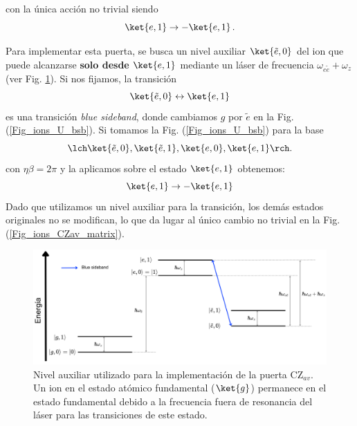 con la única acción no trivial siendo 
	\begin{equation}
	\ket{e,1} \rightarrow - \ket{e,1} \, .
	\end{equation}

Para implementar esta puerta, se busca un nivel auxiliar $\ket{\tilde{e},0}$ del ion que puede alcanzarse \textbf{solo desde} $\ket{e,1}$ mediante un láser de frecuencia $\omega_{e\tilde{e}} + \omega_z$ (ver Fig. \ref{Fig_ions_Niveles_CZav}). Si nos fijamos, la transición
	\begin{equation}
	\ket{\tilde{e},0} \leftrightarrow \ket{e,1}
	\end{equation}
es una transición \textit{blue sideband}, donde cambiamos $g$ por $\tilde{e}$ en la Fig. (\ref{Fig_ions_U_bsb}). Si tomamos la Fig. (\ref{Fig_ions_U_bsb}) para la base 
	\begin{equation}
	\lch \ket{\tilde{e},0}, \ket{\tilde{e},1}, \ket{e,0}, \ket{e,1} \rch.
	\end{equation}
	con $\eta \beta = 2\pi$ y la aplicamos sobre el estado $\ket{e,1}$ obtenemos:
	\begin{equation} 
	\ket{e,1} \rightarrow -\ket{e,1}
	\end{equation}	
Dado que utilizamos un nivel auxiliar para la transición, los demás estados originales no se modifican, lo que da lugar al único cambio no trivial en la Fig. (\ref{Fig_ions_CZav_matrix}).



	\begin{figure}[h]
	\centering 
	\includegraphics[width=1\linewidth]{Figuras/Fig_ions_Niveles_CZav.png}
	\caption{Nivel auxiliar utilizado para la implementación de la puerta $\text{CZ}_{av}$. Un ion en el estado atómico fundamental ($\ket{g}$) permanece en el estado fundamental debido a la frecuencia fuera de resonancia  del láser para las transiciones de este estado.}
	\label{Fig_ions_Niveles_CZav}
	\end{figure}



